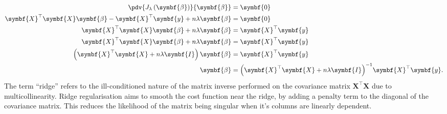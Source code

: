 \documentclass{article}
\begin{document}
\begin{align*}
    \pdv{J_{\lambda}\left( \symbf{\beta} \right)}{\symbf{\beta}}                                & = \symbf{0}                                                                                      \\
    \symbf{X}^\top \symbf{X} \symbf{\beta} - \symbf{X}^\top \symbf{y} + n \lambda \symbf{\beta} & = \symbf{0}                                                                                      \\
    \symbf{X}^\top \symbf{X} \symbf{\beta} + n \lambda \symbf{\beta}                            & = \symbf{X}^\top \symbf{y}                                                                       \\
    \symbf{X}^\top \symbf{X} \symbf{\beta} + n \lambda \symbf{\beta}                            & = \symbf{X}^\top \symbf{y}                                                                       \\
    \left( \symbf{X}^\top \symbf{X} + n \lambda \symbf{I} \right) \symbf{\beta}                 & = \symbf{X}^\top \symbf{y}                                                                       \\
    \symbf{\beta}                                                                               & = {\left( \symbf{X}^\top \symbf{X} + n \lambda \symbf{I} \right)}^{-1} \symbf{X}^\top \symbf{y}.
\end{align*}
The term ``ridge'' refers to the ill-conditioned nature of the matrix
inverse performed on the covariance matrix \(\symbf{X}^\top \symbf{X}\)
due to multicollinearity.
Ridge regularisation aims to smooth the cost function near the ridge,
by adding a penalty term to the diagonal of the covariance matrix. This
reduces the likelihood of the matrix being singular when it's columns
are linearly dependent.
\end{document}
